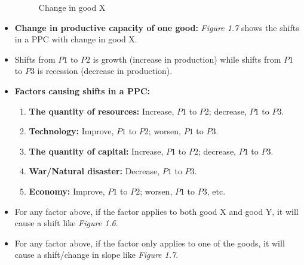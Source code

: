 \documentclass[11pt, a4paper, openany]{book}
\begin{document}
\begin{itemize}
\begin{figure}[!h]
\begin{minipage}{0.45\textwidth}
\begin{tikzpicture}[scale=1]
                \end{tikzpicture}
                \caption{Change in good X}
            \end{minipage}
        \end{figure}
    \item \textbf{Change in productive capacity of one good:} \textit{Figure 1.7} shows the shifts in a PPC with change in good X.
    \item Shifts from $P1$ to $P2$ is growth (increase in production) while shifts from $P1$ to $P3$ is recession (decrease in production).
    \item \textbf{Factors causing shifts in a PPC:}
        \begin{enumerate}\itemsep0em
            \item \textbf{The quantity of resources:} Increase, $P1$ to $P2$; decrease, $P1$ to $P3$.
            \item \textbf{Technology:} Improve, $P1$ to $P2$; worsen, $P1$ to $P3$.
            \item \textbf{The quantity of capital:} Increase, $P1$ to $P2$; decrease, $P1$ to $P3$.
            \item \textbf{War/Natural disaster:} Decrease, $P1$ to $P3$.
            \item \textbf{Economy:} Improve, $P1$ to $P2$; worsen, $P1$ to $P3$, etc.
        \end{enumerate}
    \item For any factor above, if the factor applies to both good X and good Y, it will cause a shift like \textit{Figure 1.6}.
    \item For any factor above, if the factor only applies to one of the goods, it will cause a shift/change in slope like \textit{Figure 1.7}.
\end{itemize}
\end{document}
